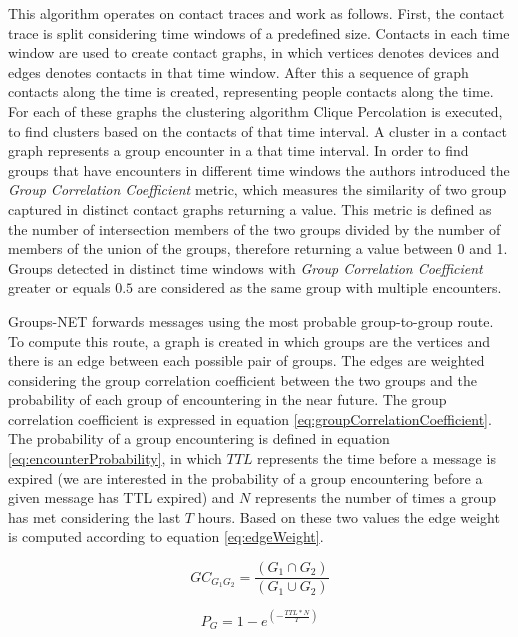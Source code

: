 This algorithm operates on contact traces and work as follows. First, the contact trace is split considering time windows of a predefined size. Contacts in each time window are used to create contact graphs, in which vertices denotes devices and edges denotes contacts in that time window. After this a sequence of graph contacts along the time is created, representing people contacts along the time. For each of these graphs the clustering algorithm Clique Percolation \citep{derenyi2005clique} is executed, to find clusters based on the contacts of that time interval. A cluster in a contact graph represents a group encounter in a that time interval. In order to find groups that have encounters in different time windows the authors introduced the \textit{Group Correlation Coefficient} metric, which measures the similarity of two group captured in distinct contact graphs returning a value. This metric is defined as the number of intersection members of the two groups divided by the number of members of the union of the groups, therefore returning a value between 0 and 1. Groups detected in distinct time windows with \textit{Group Correlation Coefficient} greater or equals $0.5$ are considered as the same group with multiple encounters.

Groups-NET forwards messages using the most probable group-to-group route. To compute this route, a graph is created in which groups are the vertices and there is an edge between each possible pair of groups. The edges are weighted considering the group correlation coefficient between the two groups and the probability of each group of encountering in the near future. The group correlation coefficient is expressed in equation \ref{eq:groupCorrelationCoefficient}. The probability of a group encountering is defined in equation \ref{eq:encounterProbability}, in which $TTL$ represents the time before a message is expired (we are interested in the probability of a group encountering before a given message has TTL expired) and $N$ represents the number of times a group has met considering the last $T$ hours. Based on these two values the edge weight is computed according to equation \ref{eq:edgeWeight}.

\begin{equation}
	\label{eq:groupCorrelationCoefficient}
	GC_{G_1G_2} = \frac{(G_1 \cap G_2)}{(G_1 \cup G_2)}
\end{equation}

\begin{equation}
	\label{eq:encounterProbability}
    P_G = 1 - e^{(-\frac{TTL * N}{T})}
\end{equation}

